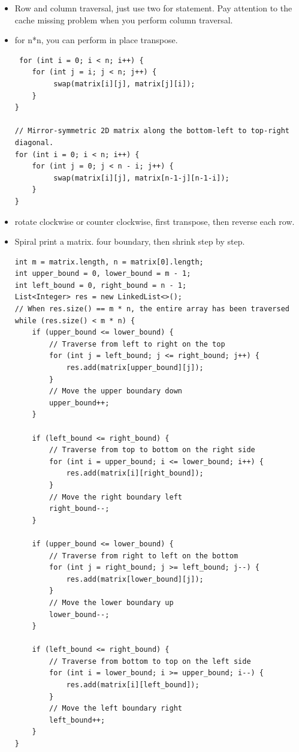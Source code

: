 \documentclass[a4paper,11pt,twoside]{book}
\begin{document}
\begin{itemize}
	
	\item Row and column traversal, just use two for statement. Pay attention to the cache missing problem when you perform column traversal. 
	
	\item  for n*n, you can perform in place transpose. 
\begin{lstlisting}
 for (int i = 0; i < n; i++) {
	for (int j = i; j < n; j++) {
		 swap(matrix[i][j], matrix[j][i]);
	}
}

// Mirror-symmetric 2D matrix along the bottom-left to top-right diagonal.
for (int i = 0; i < n; i++) {
	for (int j = 0; j < n - i; j++) {
		 swap(matrix[i][j], matrix[n-1-j][n-1-i]);
	}
}
\end{lstlisting}

	\item rotate clockwise or counter clockwise, first transpose, then reverse each row. 
	
	\item Spiral print a matrix. four boundary, then shrink step by step. 
\begin{lstlisting}
int m = matrix.length, n = matrix[0].length;
int upper_bound = 0, lower_bound = m - 1;
int left_bound = 0, right_bound = n - 1;
List<Integer> res = new LinkedList<>();
// When res.size() == m * n, the entire array has been traversed
while (res.size() < m * n) {
	if (upper_bound <= lower_bound) {
		// Traverse from left to right on the top
		for (int j = left_bound; j <= right_bound; j++) {
			res.add(matrix[upper_bound][j]);
		}
		// Move the upper boundary down
		upper_bound++;
	}
	
	if (left_bound <= right_bound) {
		// Traverse from top to bottom on the right side
		for (int i = upper_bound; i <= lower_bound; i++) {
			res.add(matrix[i][right_bound]);
		}
		// Move the right boundary left
		right_bound--;
	}
	
	if (upper_bound <= lower_bound) {
		// Traverse from right to left on the bottom
		for (int j = right_bound; j >= left_bound; j--) {
			res.add(matrix[lower_bound][j]);
		}
		// Move the lower boundary up
		lower_bound--;
	}
	
	if (left_bound <= right_bound) {
		// Traverse from bottom to top on the left side
		for (int i = lower_bound; i >= upper_bound; i--) {
			res.add(matrix[i][left_bound]);
		}
		// Move the left boundary right
		left_bound++;
	}
}
\end{lstlisting}


\end{itemize}
\end{document}
